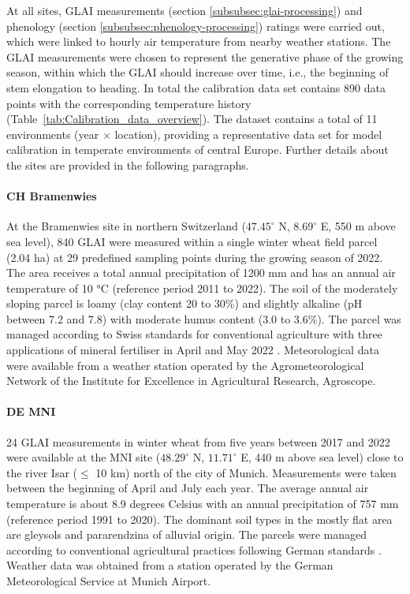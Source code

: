 At all sites, \gls{GLAI} measurements (section \ref{subsubsec:glai-processing}) and phenology (section \ref{subsubsec:phenology-processing}) ratings were carried out, which were linked to hourly air temperature from nearby weather stations. The \gls{GLAI} measurements were chosen to represent the generative phase of the growing season, within which the \gls{GLAI} should increase over time, i.e., the beginning of stem elongation to heading. In total the calibration data set contains 890 data points with the corresponding temperature history (Table~\ref{tab:Calibration_data_overview}). The dataset contains a total of 11 environments (year $\times$ location), providing a representative data set for model calibration in temperate environments of central Europe. Further details about the sites are provided in the following paragraphs.

\paragraph{CH Bramenwies}
At the Bramenwies site in northern Switzerland ($47.45^\circ$ N, $8.69^\circ$ E, 550 m above sea level), 840 \gls{GLAI} were measured within a single winter wheat field parcel (2.04 ha) at 29 predefined sampling points during the growing season of 2022. The area receives a total annual precipitation of 1200 mm and has an annual air temperature of 10 °C (reference period 2011 to 2022). The soil of the moderately sloping parcel is loamy (clay content 20 to 30\%) and slightly alkaline (pH between 7.2 and 7.8) with moderate humus content (3.0 to 3.6\%). The parcel was managed according to Swiss standards for conventional agriculture with three applications of mineral fertiliser in April and May 2022 \citep{wildhaber_assessing_2023}. Meteorological data were available from a weather station operated by the Agrometeorological Network of the Institute for Excellence in Agricultural Research, Agroscope.

\paragraph{DE MNI}
24 \gls{GLAI} measurements in winter wheat from five years between 2017 and 2022 were available at the MNI site ($48.29^\circ$ N, $11.71^\circ$ E, 440 m above sea level) close to the river Isar ($\le$ 10 km) north of the city of Munich. Measurements were taken between the beginning of April and July each year. The average annual air temperature is about 8.9 degrees Celsius with an annual precipitation of 757 mm (reference period 1991 to 2020). The dominant soil types in the mostly flat area are gleysols and pararendzina of alluvial origin. The parcels were managed according to conventional agricultural practices following German standards \citep{danner_retrieval_2017, danner_fitted_2019, wocher_physically-based_2018}. Weather data was obtained from a station operated by the German Meteorological Service at Munich Airport.

